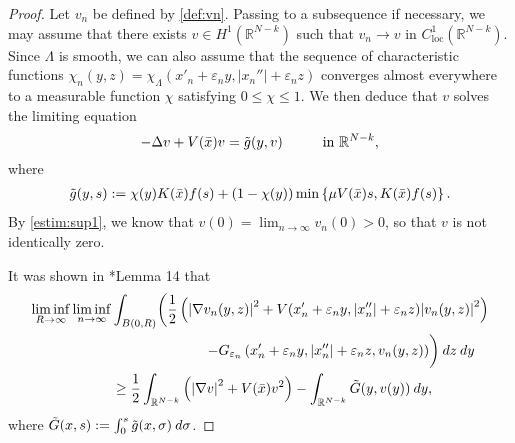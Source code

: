 \documentclass[a4paper]{amsart}
\begin{document}
\begin{proof}
Let $v_n$ be defined by \eqref{def:vn}. Passing to a subsequence if necessary, we may assume that there exists $v \in
H^1({\mathbb{R}}^{N-k})$ such that $v_n \to v$ in $C^1_{\mathrm{loc}}({\mathbb{R}}^{N-k})$. Since $\Lambda$ is smooth, we can also assume that
the sequence of characteristic functions $\chi_n(y, z) = \chi_{\Lambda}(x'_n+\varepsilon_n y,{\left| {x_n''} \right|}+\varepsilon_n z)$
converges almost everywhere to a measurable function $\chi$ satisfying $0\leq \chi \leq 1$. We then deduce that $v$
solves the limiting equation
\[
 -\Delta v + V(\bar{x})v = \Tilde{g}(y, v) \hspace{1cm} \text{in} \ {\mathbb{R}}^{N-k},
\]
where
\begin{align*}
 \Tilde{g}(y, s) := \chi(y) K(\bar{x}) f(s) + \left( 1-\chi(y) \right) \min\left\lbrace \mu V(\bar{x}) s, K(\bar{x})f(s)
\right\rbrace.
\end{align*}
 By \eqref{estim:sup1}, we know that $v(0) = \lim_{n\to\infty} v_n(0) > 0$, so that $v$ is not identically zero.
 
It was shown in \cite{BVS}*{Lemma 14} that
\begin{multline*}
 \liminf_{R\to\infty}\liminf_{n\to\infty} \int_{B(0,R)} \biggl( \frac{1}{2} \left( {\left| {\nabla v_n(y, z)} \right|}^2 + V(x'_n +
\varepsilon_n y, {\left| {x''_n} \right|} + \varepsilon_n z){\left| {v_n(y, z)} \right|}^2 \right) \\ \shoveright{- G_{\varepsilon_n}\left(x'_n + \varepsilon_n
y, {\left| {x''_n} \right|} + \varepsilon_n z,v_n(y, z)\right) \biggr)\: dz\: dy} \\ \qquad \geq \frac{1}{2} \int_{{\mathbb{R}}^{N-k}} \left( 
{\left| {\nabla v} \right|}^2 + V(\bar{x}) v^2 \right) - \int_{{\mathbb{R}}^{N-k}} \Tilde{G}(y,v(y))\: dy,
 \end{multline*}
where $\Tilde{G}(x,s) := \int_0^s \Tilde{g}(x,\sigma)\: d\sigma$.


\end{proof}
\end{document}
